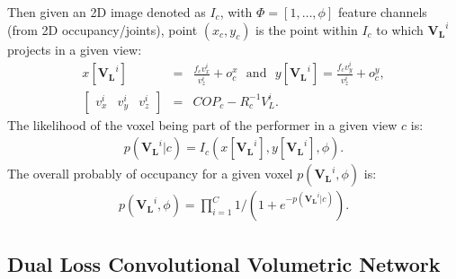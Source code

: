 \documentclass{bmvc2k}
\begin{document}
Then given an 2D image denoted as $I_c$, with $\Phi =\left[1, \dots, \phi\right] $ feature channels (from 2D occupancy/joints), point $(x_c,y_c)$ is the point within $I_c$ to which $\mathbf{V_L}^i$ projects in a given view:
\begin{eqnarray}
x[\mathbf{V_L}^i]&=&\frac{f_c v_x^i}{v_z^i}+o^x_c ~~~\mathrm{and} ~~~y[\mathbf{V_L}^i]=\frac{f_c v_y^i}{v_z^i}+o^y_c,\\
\left[
\begin{array}{ccc} v_x^i &v_y^i &v_z^i\end{array}\right] &=& {COP}_c - R_c^{-1} V_L^i. \label{eq:pvh3}
\end{eqnarray}
The likelihood of the voxel being part of the performer in a given view $c$ is: 
\begin{eqnarray}
p(\mathbf{V_L}^i | c) = I_c(x[\mathbf{V_L}^i],y[\mathbf{V_L}^i],\phi).  \label{eq:pvh1}
\end{eqnarray}
The overall probably of occupancy for a given voxel $p(\mathbf{V_L}^i,\phi)$ is:
\begin{eqnarray}
p(\mathbf{V_L}^i,\phi) = \prod_{i=1}^C 1/(1+e^{-p(\mathbf{V_L}^i|c)}). \label{eq:pvh4}
\end{eqnarray}





\subsection{Dual Loss Convolutional Volumetric Network}
\label{sec:autoenc}
\end{document}
